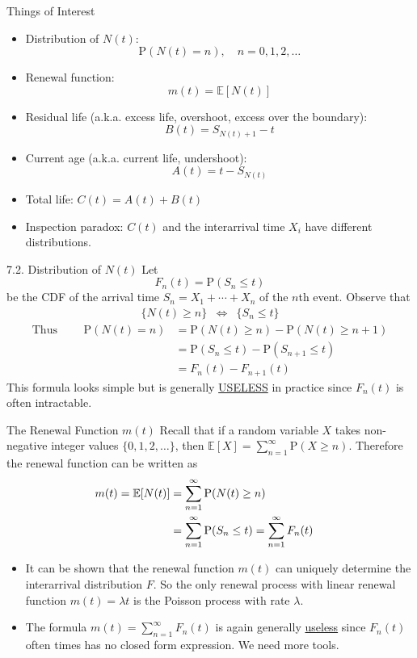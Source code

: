 \documentclass[letterpaper,handout, mathserif]{beamer}
\def\p{\mathrm P}
\def\E{\mathbb E}
\begin{document}
\begin{frame}{Things of Interest}
\begin{itemize}[<+->]
\item Distribution of $N(t)$: $$\p(N(t)=n),\quad n=0,1,2,\ldots$$
\item Renewal function: $$m(t)=\E[N(t)]$$
\item Residual life (a.k.a. excess life, overshoot, excess over the boundary):
$$B(t)=S_{N(t)+1}-t$$
\item Current age (a.k.a. current life, undershoot):
$$A(t)=t-S_{N(t)}$$
\item Total life: $C(t)=A(t)+B(t)$
\item Inspection paradox: $C(t)$ and the interarrival time $X_i$ have different distributions.
\end{itemize}
\end{frame}
\begin{frame}{7.2. Distribution of $N(t)$}
Let $$F_n(t)=\p(S_n\le t)$$
be the CDF of the arrival time $S_n=X_1+\cdots+X_n$ of the $n$th event.
Observe that
\begin{eqnarray*}
\{N(t)\ge n\}&\Leftrightarrow& \{S_n\le t\}
\end{eqnarray*}
\begin{align*}
\text{Thus }\quad\quad\p(N(t) = n) &= \p(N(t) \ge n) - \p(N(t) \ge n+ 1)\\
&= \p(S_n \le t) - \p(S_{n+1} \le t)\\
&=F_{n}(t)-F_{n+1}(t)
\end{align*}
This formula looks simple but is generally \underline{USELESS} in practice since $F_{n}(t)$ is often intractable.
\end{frame}
\begin{frame}{The Renewal Function $m(t)$}
Recall that if a random variable $X$ takes non-negative integer values $\{0,1,2,\ldots\}$, then
$\E[X]=\sum_{n=1}^{\infty}\p(X\ge n)$. Therefore the renewal function can be written as
\begin{align*}
m(t)=\E[N(t)]&=\sum_{n=1}^{\infty}\p(N(t)\ge n)\cr
&=\sum_{n=1}^{\infty}\p(S_n\le t)=\sum_{n=1}^{\infty}F_n(t)
\end{align*}

\vspace{-6pt}
\begin{itemize}
\item It can be shown that the renewal function $m(t)$ can uniquely determine the interarrival distribution $F$.
So the only renewal process with linear renewal function $m(t)=\lambda t$ is the Poisson process with rate $\lambda$.
\item The formula $m(t)=\sum_{n=1}^{\infty}F_n(t)$ is again generally \underline{useless} since $F_n(t)$ often times has no closed form expression.
We need more tools.
\end{itemize}
\end{frame}
\end{document}
